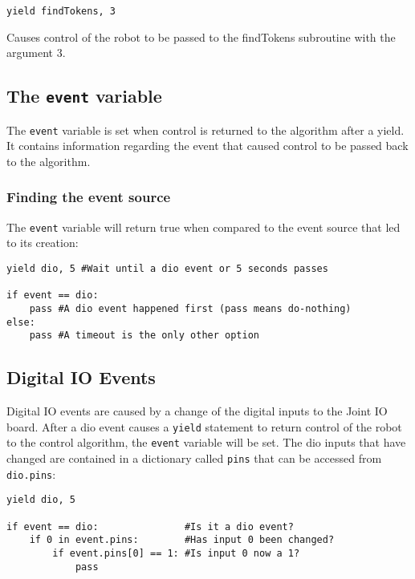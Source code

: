 \documentclass{article}
\begin{document}
\texttt{yield findTokens, 3}

Causes control of the robot to be passed to the findTokens subroutine with the
argument 3.
\subsection{The \texttt{event} variable}
The \texttt{event} variable is set when control is returned to the algorithm
after a yield. It contains information regarding the event that caused control
to be passed back to the algorithm.
\subsubsection{Finding the event source}
The \texttt{event} variable will return true when compared to the event source that led
to its creation:

\begin{verbatim}
yield dio, 5 #Wait until a dio event or 5 seconds passes

if event == dio:
    pass #A dio event happened first (pass means do-nothing)
else:
    pass #A timeout is the only other option
\end{verbatim}
\subsection{Digital IO Events}
Digital IO events are caused by a change of the digital inputs to the Joint IO
board. After a dio event causes a \texttt{yield} statement to return control of
the robot to the control algorithm, the \texttt{event} variable will be set.
The dio inputs that have changed are contained in a dictionary called
\texttt{pins} that can be accessed from \texttt{dio.pins}:

\begin{verbatim}
yield dio, 5

if event == dio:               #Is it a dio event?
    if 0 in event.pins:        #Has input 0 been changed?
        if event.pins[0] == 1: #Is input 0 now a 1?
            pass
\end{verbatim}
\end{document}
